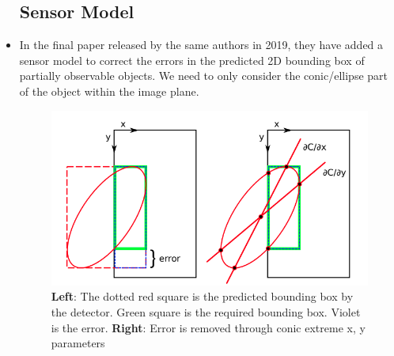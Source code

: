 \documentclass{article}
\begin{document}
\begin{itemize}
\subsection{Sensor Model}


    \item In the final paper released by the same authors in 2019\cite{quadric2}, they have added a sensor model to correct the errors in the predicted 2D bounding box of partially observable objects. We need to only consider the conic/ellipse part of the object within the image plane. 
    
    \begin{figure}[H]
    \centering
    \includegraphics[width=\textwidth, height=0.3\textheight] {Images/bbox_error.png}
    \caption{\centering\textbf{Left}: The dotted red square is the predicted bounding box by the detector. Green square is the required bounding box. Violet is the error. \textbf{Right}: Error is removed through conic extreme x, y parameters\cite{quadric2}}
    \label{fig:bbox_error}
\end{figure}


\end{itemize}
\end{document}

